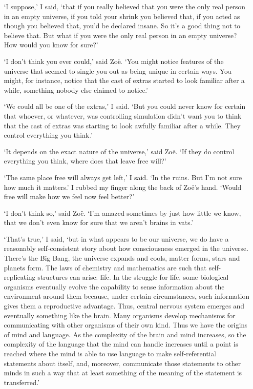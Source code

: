`I suppose,' I said, `that if you really believed that you were the
only real person in an empty universe, if you told your shrink you
believed that, if you acted as though you believed that, you'd be
declared insane. So it's a good thing not to believe that. But what
if you were the only real person in an empty universe? How would you
know for sure?'

`I don't think you ever could,' said Zoë. `You might notice
features of the universe that seemed to single you out as being
unique in certain ways. You might, for instance, notice that the
cast of extras started to look familiar after a while, something
nobody else claimed to notice.'

`We could all be one of the extras,' I said. `But you could never
know for certain that whoever, or whatever, was controlling
simulation didn't want you to think that the cast of extras was
starting to look awfully familiar after a while. They control
everything you think.'

`It depends on the exact nature of the universe,' said Zoë. `If
they do control everything you think, where does that leave free
will?'

`The same place free will always get left,' I said. `In the ruins.
But I'm not sure how much it matters.' I rubbed my finger along the
back of Zoë's hand. `Would free will make how we feel now feel
better?'

`I don't think so,' said Zoë. `I'm amazed sometimes by just how
little we know, that we don't even know for sure that we aren't
brains in vats.'

`That's true,' I said, `but in what appears to be our universe, we
do have a reasonably self-consistent story about how consciousness
emerged in the universe. There's the Big Bang, the universe expands
and cools, matter forms, stars and planets form. The laws of
chemistry and mathematics are such that self-replicating structures
can arise: life. In the struggle for life, some biological organisms
eventually evolve the capability to sense information about the
environment around them because, under certain circumstances, such
information gives them a reproductive advantage. Thus, central
nervous system emerges and eventually something like the brain. Many
organisms develop mechanisms for communicating with other organisms
of their own kind. Thus we have the origins of mind and language. As
the complexity of the brain and mind increases, so the complexity of
the language that the mind can handle increases until a point is
reached where the mind is able to use language to make
self-referential statements about itself, and, moreover, communicate
those statements to other minds in such a way that at least
something of the meaning of the statement is transferred.'

